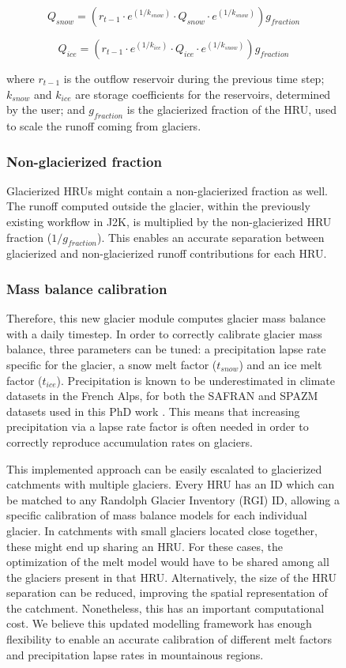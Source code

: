 \begin{figure}[h]
\begin{equation} \label{hydro:eq:16}
Q_{snow} = (r_{t-1 }\cdot e^{(1/k_{snow})} \cdot Q_{snow} \cdot e^{(1/k_{snow})})g_{fraction}
\end{equation} 

\begin{equation} \label{hydro:eq:17}
Q_{ice} = (r_{t-1} \cdot e^{(1/k_{ice})} \cdot Q_{ice} \cdot e^{(1/k_{snow})})g_{fraction}
\end{equation} 

where $r_{t-1}$ is the outflow reservoir during the previous time step; $k_{snow}$ and $k_{ice}$ are storage coefficients for the reservoirs, determined by the user; and $g_{fraction}$ is the glacierized fraction of the HRU, used to scale the runoff coming from glaciers. 

\subsubsection{Non-glacierized fraction}

Glacierized HRUs might contain a non-glacierized fraction as well. The runoff computed outside the glacier, within the previously existing workflow in J2K, is multiplied by the non-glacierized HRU fraction ($1/g_{fraction}$). This enables an accurate separation between glacierized and non-glacierized runoff contributions for each HRU. 

\subsubsection{Mass balance calibration}

Therefore, this new glacier module computes glacier mass balance with a daily timestep. In order to correctly calibrate glacier mass balance, three parameters can be tuned: a precipitation lapse rate specific for the glacier, a snow melt factor ($t_{snow}$) and an ice melt factor ($t_{ice}$). Precipitation is known to be underestimated in climate datasets in the French Alps, for both the SAFRAN and SPAZM datasets used in this PhD work \citep{vionnet_numerical_2016}. This means that increasing precipitation via a lapse rate factor is often needed in order to correctly reproduce accumulation rates on glaciers. 

This implemented approach can be easily escalated to glacierized catchments with multiple glaciers. Every HRU has an ID which can be matched to any Randolph Glacier Inventory (RGI) ID, allowing a specific calibration of mass balance models for each individual glacier. In catchments with small glaciers located close together, these might end up sharing an HRU. For these cases, the optimization of the melt model would have to be shared among all the glaciers present in that HRU. Alternatively, the size of the HRU separation can be reduced, improving the spatial representation of the catchment. Nonetheless, this has an important computational cost. We believe this updated modelling framework has enough flexibility to enable an accurate calibration of different melt factors and precipitation lapse rates in mountainous regions. 


\end{figure}
